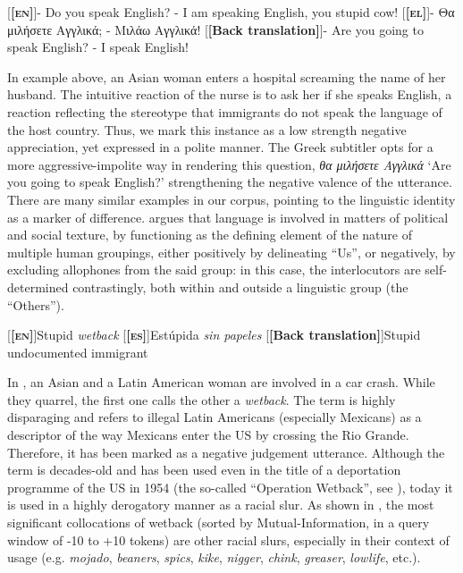 \documentclass[output=paper]{LSP/langsci}
\begin{document}
\ea \label{ex:2:25}
\begin{xlist}
\exi{}[\textbf{[\textsc{en}]}]{- Do you speak English? - I am speaking English, you stupid cow!}
\exi{}[\textbf{[\textsc{el}]}]{- Θα μιλήσετε Αγγλικά; - Μιλάω Αγγλικά!}
\exi{}[\textbf{[Back translation]}]{- Are you going to speak English? - I speak English!}
\end{xlist}
\z

In example  above, an Asian woman enters a hospital screaming the name of her husband. The intuitive reaction of the nurse is to ask her if she speaks English, a reaction reflecting the stereotype that immigrants do not speak the language of the host country. Thus, we mark this instance as a low strength negative appreciation, yet expressed in a polite manner. The Greek subtitler opts for a more aggressive-impolite way in rendering this question, \textit{θα μιλήσετε Αγγλικά} `Are you going to speak English?' strengthening the negative valence of the utterance. There are many similar examples in our corpus, pointing to the linguistic identity as a marker of difference. \citet[111]{Sella2001} argues that language is involved in matters of political and social texture, by functioning as the defining element of the nature of multiple human groupings, either positively by delineating “Us”, or negatively, by excluding allophones from the said group: in this case, the interlocutors are self-determined contrastingly, both within and outside a linguistic group (the “Others”).

\ea \label{ex:2:26}
\begin{xlist}
\exi{}[\textbf{[\textsc{en}]}]{Stupid \emph{wetback}}
\exi{}[\textbf{[\textsc{es}]}]{Estúpida \emph{sin papeles}}
\exi{}[\textbf{[Back translation]}]{Stupid undocumented immigrant}
\end{xlist}
\z

In , an Asian and a Latin American woman are involved in a car crash. While they quarrel, the first one calls the other a \textit{wetback}. The term is highly disparaging and refers to illegal Latin Americans (especially Mexicans) as a descriptor of the way Mexicans enter the US by crossing the Rio Grande. Therefore, it has been marked as a negative judgement utterance. Although the term is decades-old and has been used even in the title of a deportation programme of the US in 1954 (the so-called “Operation Wetback”, see \citealt{Hernandez2006}), today it is used in a highly derogatory manner as a racial slur. As shown in , the most significant collocations of wetback (sorted by Mutual-Information, in a query window of {-10 to +10} tokens) are other racial slurs, especially in their context of usage (e.g. \textit{mojado}, \textit{beaners}, \textit{spics}, \textit{kike}, \textit{nigger}, \textit{chink}, \textit{greaser}, \textit{lowlife}, etc.).
\end{document}

